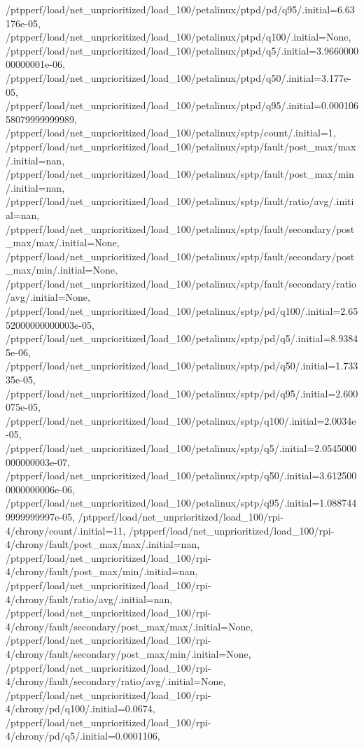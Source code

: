 {    /ptpperf/load/net_unprioritized/load_100/petalinux/ptpd/pd/q95/.initial=6.63176e-05,
    /ptpperf/load/net_unprioritized/load_100/petalinux/ptpd/q100/.initial=None,
    /ptpperf/load/net_unprioritized/load_100/petalinux/ptpd/q5/.initial=3.966000000000001e-06,
    /ptpperf/load/net_unprioritized/load_100/petalinux/ptpd/q50/.initial=3.177e-05,
    /ptpperf/load/net_unprioritized/load_100/petalinux/ptpd/q95/.initial=0.00010658079999999989,
    /ptpperf/load/net_unprioritized/load_100/petalinux/sptp/count/.initial=1,
    /ptpperf/load/net_unprioritized/load_100/petalinux/sptp/fault/post_max/max/.initial=nan,
    /ptpperf/load/net_unprioritized/load_100/petalinux/sptp/fault/post_max/min/.initial=nan,
    /ptpperf/load/net_unprioritized/load_100/petalinux/sptp/fault/ratio/avg/.initial=nan,
    /ptpperf/load/net_unprioritized/load_100/petalinux/sptp/fault/secondary/post_max/max/.initial=None,
    /ptpperf/load/net_unprioritized/load_100/petalinux/sptp/fault/secondary/post_max/min/.initial=None,
    /ptpperf/load/net_unprioritized/load_100/petalinux/sptp/fault/secondary/ratio/avg/.initial=None,
    /ptpperf/load/net_unprioritized/load_100/petalinux/sptp/pd/q100/.initial=2.6552000000000003e-05,
    /ptpperf/load/net_unprioritized/load_100/petalinux/sptp/pd/q5/.initial=8.93845e-06,
    /ptpperf/load/net_unprioritized/load_100/petalinux/sptp/pd/q50/.initial=1.73335e-05,
    /ptpperf/load/net_unprioritized/load_100/petalinux/sptp/pd/q95/.initial=2.600075e-05,
    /ptpperf/load/net_unprioritized/load_100/petalinux/sptp/q100/.initial=2.0034e-05,
    /ptpperf/load/net_unprioritized/load_100/petalinux/sptp/q5/.initial=2.0545000000000003e-07,
    /ptpperf/load/net_unprioritized/load_100/petalinux/sptp/q50/.initial=3.6125000000000006e-06,
    /ptpperf/load/net_unprioritized/load_100/petalinux/sptp/q95/.initial=1.0887449999999997e-05,
    /ptpperf/load/net_unprioritized/load_100/rpi-4/chrony/count/.initial=11,
    /ptpperf/load/net_unprioritized/load_100/rpi-4/chrony/fault/post_max/max/.initial=nan,
    /ptpperf/load/net_unprioritized/load_100/rpi-4/chrony/fault/post_max/min/.initial=nan,
    /ptpperf/load/net_unprioritized/load_100/rpi-4/chrony/fault/ratio/avg/.initial=nan,
    /ptpperf/load/net_unprioritized/load_100/rpi-4/chrony/fault/secondary/post_max/max/.initial=None,
    /ptpperf/load/net_unprioritized/load_100/rpi-4/chrony/fault/secondary/post_max/min/.initial=None,
    /ptpperf/load/net_unprioritized/load_100/rpi-4/chrony/fault/secondary/ratio/avg/.initial=None,
    /ptpperf/load/net_unprioritized/load_100/rpi-4/chrony/pd/q100/.initial=0.0674,
    /ptpperf/load/net_unprioritized/load_100/rpi-4/chrony/pd/q5/.initial=0.0001106,
}
